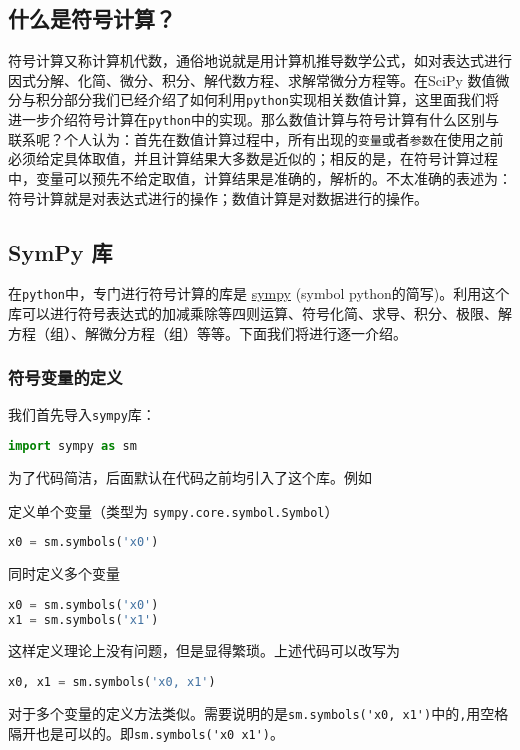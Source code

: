 
\subsection{什么是符号计算？}
符号计算又称计算机代数，通俗地说就是用计算机推导数学公式，如对表达式进行因式分解、化简、微分、积分、解代数方程、求解常微分方程等。在SciPy 数值微分与积分部分我们已经介绍了如何利用\verb|python|实现相关数值计算，这里面我们将进一步介绍符号计算在\verb|python|中的实现。那么数值计算与符号计算有什么区别与联系呢？个人认为：首先在数值计算过程中，所有出现的\verb|变量|或者\verb|参数|在使用之前必须给定具体取值，并且计算结果大多数是近似的；相反的是，在符号计算过程中，变量可以预先不给定取值，计算结果是准确的，解析的。不太准确的表述为：符号计算就是对表达式进行的操作；数值计算是对数据进行的操作。

\subsection{SymPy 库}
在\verb|python|中，专门进行符号计算的库是 \href{https://www.sympy.org/en/index.html}{sympy} (symbol python的简写)。利用这个库可以进行符号表达式的加减乘除等四则运算、符号化简、求导、积分、极限、解方程（组）、解微分方程（组）等等。下面我们将进行逐一介绍。

\subsubsection{符号变量的定义}
我们首先导入\verb|sympy|库：
\begin{lstlisting}[language=python]
import sympy as sm
\end{lstlisting}
为了代码简洁，后面默认在代码之前均引入了这个库。例如

定义单个变量（类型为 \verb|sympy.core.symbol.Symbol|）
\begin{lstlisting}[language=python]
x0 = sm.symbols('x0')
\end{lstlisting}
同时定义多个变量
\begin{lstlisting}[language=python]
x0 = sm.symbols('x0')
x1 = sm.symbols('x1')
\end{lstlisting}
这样定义理论上没有问题，但是显得繁琐。上述代码可以改写为
\begin{lstlisting}[language=python]
x0, x1 = sm.symbols('x0, x1')
\end{lstlisting}
对于多个变量的定义方法类似。需要说明的是\verb|sm.symbols('x0, x1')|中的\verb|,|用空格隔开也是可以的。即\verb|sm.symbols('x0 x1')|。

